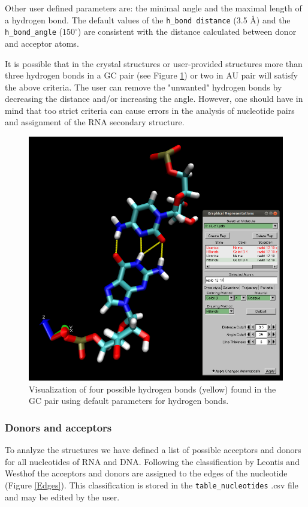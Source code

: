 \documentclass[12pt]{article}
\begin{document}
Other user defined parameters are: the minimal angle and the maximal length of a hydrogen bond. The default values of the {\tt h\_bond distance} (3.5 \AA) and the {\tt h\_bond\_angle} ($150^\circ$) are consistent with the distance calculated between donor and acceptor atoms.

It is possible that in the crystal structures or user-provided structures more than three hydrogen bonds in a GC pair (see Figure \ref{hbond4}) or two in AU pair will satisfy the above criteria. The user can remove the "unwanted" hydrogen bonds by decreasing the distance and/or increasing the angle. However, one should have in mind that too strict criteria can cause errors in the analysis of nucleotide pairs and assignment of the RNA secondary structure. 
\begin{figure}[h!btp]
\centering
\includegraphics[width = 12cm]{./pictures/hbonds-GC-4.png}
\caption{Visualization of four possible hydrogen bonds (yellow) found in the GC pair using default parameters for hydrogen bonds.}
\label{hbond4}
\end{figure}


\subsubsection{Donors and acceptors} \label{donrsandacceptors}
To analyze the structures we have defined a list of possible acceptors and donors for all nucleotides of RNA and DNA. Following the classification by Leontis and Westhof \cite{Leontis2002} the acceptors and donors are assigned to the edges of the nucleotide (Figure \ref{Edges}). This classification is stored in the {\tt table\_nucleotides} .csv file and may be edited by the user. 
\end{document}
